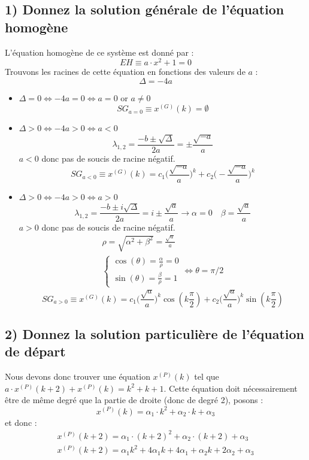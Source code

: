 \documentclass[11pt,a4paper]{report}
\begin{document}
		\subsection*{1) Donnez la solution générale de l'équation homogène}
		L'équation homogène de ce système est donné par :
		\[
			EH \equiv a \cdot x^2 + 1 = 0		
		\]
		Trouvons les racines de cette équation en fonctions des valeurs de $a$ :
		\[
			\Delta = -4a
		\]
		\begin{itemize}
			\item $\Delta = 0 \Leftrightarrow -4a = 0 \Leftrightarrow a = 0$ or $a \neq 0$\\
				\[
					SG_{a=0} \equiv  x^{(G)}(k) = \emptyset 
				\]
			\item $\Delta > 0 \Leftrightarrow -4a > 0 \Leftrightarrow a < 0$\\
				\[
					\lambda_{1,2} = \frac{-b \pm \sqrt{\Delta}}{2a} = \pm \frac{\sqrt{-a}}{a}
				\]
				$a < 0$ donc pas de soucis de racine négatif.
				\[
					SG_{a<0} \equiv  x^{(G)}(k) = c_1 \Big(\frac{\sqrt{-a}}{a} \Big)^k + c_2\Big(-\frac{\sqrt{-a}}{a}\Big)^k 
				\]
				
			\item $\Delta > 0 \Leftrightarrow -4a > 0 \Leftrightarrow a > 0$\\
				\[
					\lambda_{1,2} = \frac{-b \pm i\sqrt{\Delta}}{2a} = i\pm \frac{\sqrt{a}}{a} \rightarrow \alpha = 0 \quad \beta = \frac{\sqrt{a}}{a}
				\]
				$a > 0$ donc pas de soucis de racine négatif.
				\begin{gather*}
					\rho = \sqrt{\alpha^2 + \beta^2} = \frac{\sqrt{a}}{a} \\
					\begin{cases} 
						\cos(\theta) = \frac{\alpha}{\rho} = 0\\ 
						\sin(\theta) = \frac{\beta}{\rho} = 1
					\end{cases}
					\Leftrightarrow \theta = \pi/2
				\end{gather*}
				\[
					SG_{a>0} \equiv  x^{(G)}(k) = c_1 \Big(\frac{\sqrt{a}}{a} \Big)^k \cos(k \frac{\pi}{2}) + c_2\Big(\frac{\sqrt{a}}{a}\Big)^k \sin(k \frac{\pi}{2})
				\]
		\end{itemize}
		
		
		\subsection*{2) Donnez la solution particulière de l'équation de départ}
			Nous devons donc trouver une équation $x^{(P)}(k)$ tel que $a \cdot x^{(P)}(k+2) + x^{(P)}(k) = k^2 + k + 1$. Cette équation doit nécessairement être de même degré que la partie de droite (donc de degré 2), posons : 
			\[ 
				x^{(P)}(k) = \alpha_1 \cdot k^2 + \alpha_2 \cdot k + \alpha_3
			\]
			et donc : 
			\begin{gather*} 
				x^{(P)}(k+2) = \alpha_1 \cdot (k+2)^2 + \alpha_2 \cdot (k+2) + \alpha_3 \\
				x^{(P)}(k+2) = \alpha_1 k^2 + 4\alpha_1k + 4\alpha_1 + \alpha_2 k + 2\alpha_2 + \alpha_3
			\end{gather*}
			
\end{document}
